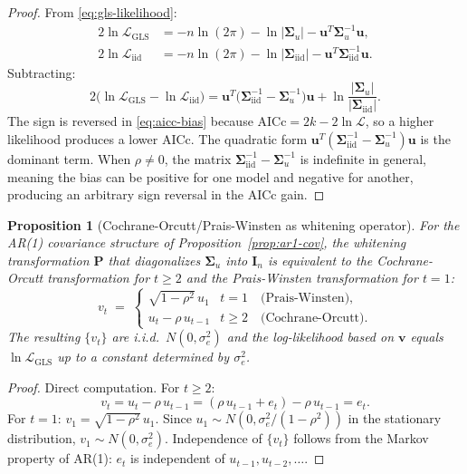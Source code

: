 \documentclass[11pt]{article}
\newtheorem{proposition}{Proposition}
\begin{document}
\begin{proof}
From \eqref{eq:gls-likelihood}:
\begin{align*}
2\ln\mathcal{L}_{\mathrm{GLS}}&=-n\ln(2\pi)-\ln|\bm{\Sigma}_u|-\bm{u}^T\bm{\Sigma}_u^{-1}\bm{u},\\
2\ln\mathcal{L}_{\mathrm{iid}}&=-n\ln(2\pi)-\ln|\bm{\Sigma}_{\mathrm{iid}}|-\bm{u}^T\bm{\Sigma}_{\mathrm{iid}}^{-1}\bm{u}.
\end{align*}
Subtracting:
\[
2\bigl(\ln\mathcal{L}_{\mathrm{GLS}}-\ln\mathcal{L}_{\mathrm{iid}}\bigr)
=\bm{u}^T\!\bigl(\bm{\Sigma}_{\mathrm{iid}}^{-1}-\bm{\Sigma}_u^{-1}\bigr)\bm{u}
+\ln\frac{|\bm{\Sigma}_u|}{|\bm{\Sigma}_{\mathrm{iid}}|}.
\]
The sign is reversed in \eqref{eq:aicc-bias} because AICc$=2k-2\ln\mathcal{L}$, so a higher likelihood produces a lower AICc. The quadratic form $\bm{u}^T(\bm{\Sigma}_{\mathrm{iid}}^{-1}-\bm{\Sigma}_u^{-1})\bm{u}$ is the dominant term. When $\rho\neq 0$, the matrix $\bm{\Sigma}_{\mathrm{iid}}^{-1}-\bm{\Sigma}_u^{-1}$ is indefinite in general, meaning the bias can be positive for one model and negative for another, producing an arbitrary sign reversal in the AICc gain.
\end{proof}

\begin{proposition}[Cochrane-Orcutt/Prais-Winsten as whitening operator]\label{prop:co-pw}
For the AR(1) covariance structure of Proposition~\ref{prop:ar1-cov}, the whitening transformation $\bm{P}$ that diagonalizes $\bm{\Sigma}_u$ into $\bm{I}_n$ is equivalent to the Cochrane-Orcutt transformation for $t\geq 2$ and the Prais-Winsten transformation for $t=1$:
\[
v_t\;=\;\begin{cases}
\sqrt{1-\rho^2}\,u_1 & t=1 \quad\text{(Prais-Winsten)},\\
u_t-\rho\,u_{t-1} & t\geq 2 \quad\text{(Cochrane-Orcutt)}.
\end{cases}
\]
The resulting $\{v_t\}$ are i.i.d.\ $N(0,\sigma_e^2)$ and the log-likelihood based on $\bm{v}$ equals $\ln\mathcal{L}_{\mathrm{GLS}}$ up to a constant determined by $\sigma_e^2$.
\end{proposition}

\begin{proof}
Direct computation. For $t\geq 2$:
\[
v_t=u_t-\rho\,u_{t-1}=(\rho\,u_{t-1}+e_t)-\rho\,u_{t-1}=e_t.
\]
For $t=1$: $v_1=\sqrt{1-\rho^2}\,u_1$. Since $u_1\sim N(0,\sigma_e^2/(1-\rho^2))$ in the stationary distribution, $v_1\sim N(0,\sigma_e^2)$. Independence of $\{v_t\}$ follows from the Markov property of AR(1): $e_t$ is independent of $u_{t-1},u_{t-2},\ldots$.
\end{proof}
\end{document}

